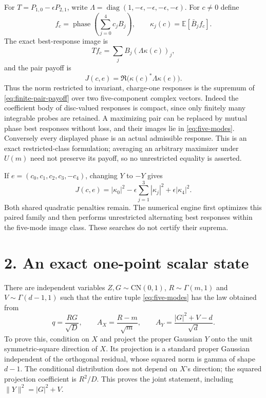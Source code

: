 \documentclass[11pt]{article}
\newcommand{\E}{\mathbb E}
\newcommand{\CN}{\mathrm{CN}}
\newcommand{\ph}{\operatorname{phase}}
\begin{document}
For $T=P_{1,0}-\epsilon P_{2,1}$, write
$\Lambda=\operatorname{diag}(1,-\epsilon,-\epsilon,-\epsilon,-\epsilon)$.
For $c\ne0$ define
\[
 f_c=\ph\left(\sum_{j=0}^4c_jB_j\right),\qquad
 \kappa_j(c)=\E[\bar B_j f_c].
\]
The exact best-response image is
\[
 Tf_c=\sum_jB_j(\Lambda\kappa(c))_j,
\]
and the pair payoff is
\begin{equation}\label{eq:finite-pair-payoff}
 J(c,e)=\Re\bigl(\kappa(c)^*\Lambda\kappa(e)\bigr).
\end{equation}
Thus the norm restricted to invariant, charge-one responses is the supremum
of \eqref{eq:finite-pair-payoff} over two five-component complex vectors.
Indeed the coefficient body of disc-valued responses is compact, since only
finitely many integrable probes are retained. A maximizing pair can be replaced
by mutual phase best responses without loss, and their images lie in
\eqref{eq:five-modes}. Conversely every displayed phase is an actual admissible
response. This is an exact restricted-class formulation; averaging an arbitrary
maximizer under $U(m)$ need not preserve its payoff, so no unrestricted equality
is asserted.

If $e=(c_0,c_1,c_2,c_3,-c_4)$, changing $Y$ to $-Y$ gives
\[
 J(c,e)=|\kappa_0|^2-\epsilon\sum_{j=1}^3|\kappa_j|^2
                    +\epsilon|\kappa_4|^2.
\]
Both shared quadratic penalties remain. The numerical engine first optimizes
this paired family and then performs unrestricted alternating best responses
within the five-mode image class. These searches do not certify their suprema.

\section*{2. An exact one-point scalar state}
There are independent variables $Z,G\sim\CN(0,1)$,
$R\sim\Gamma(m,1)$ and $V\sim\Gamma(d-1,1)$ such that the entire tuple
\eqref{eq:five-modes} has the law obtained from
\begin{equation}\label{eq:scalar-state}
 q=\frac{RG}{\sqrt D},\qquad
 A_X=\frac{R-m}{\sqrt m},\qquad
 A_Y=\frac{|G|^2+V-d}{\sqrt d}.
\end{equation}
To prove this, condition on $X$ and project the proper Gaussian $Y$ onto the unit
symmetric-square direction of $X$. Its projection is a standard proper Gaussian
independent of the orthogonal residual, whose squared norm is gamma of shape
$d-1$. The conditional distribution does not depend on $X$'s direction; the
squared projection coefficient is $R^2/D$. This proves the joint statement,
including $\|Y\|^2=|G|^2+V$.
\end{document}

